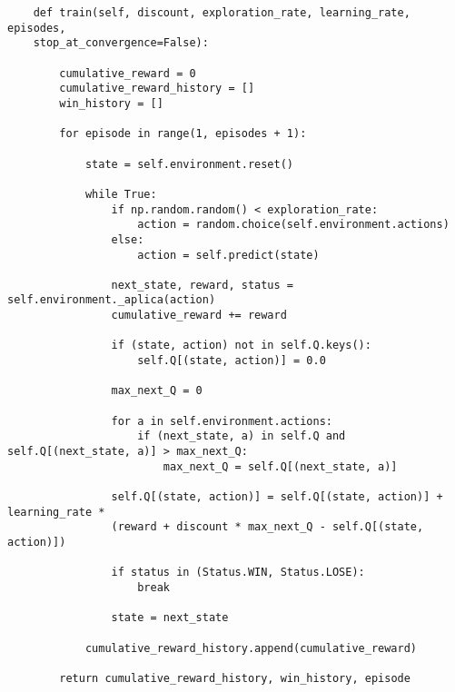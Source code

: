 \documentclass{article}
\begin{document}
\begin{verbatim}
    def train(self, discount, exploration_rate, learning_rate, episodes, 
    stop_at_convergence=False):
        
        cumulative_reward = 0
        cumulative_reward_history = []
        win_history = []

        for episode in range(1, episodes + 1):
        
            state = self.environment.reset()
            
            while True:
                if np.random.random() < exploration_rate:
                    action = random.choice(self.environment.actions)
                else:
                    action = self.predict(state)
                    
                next_state, reward, status = self.environment._aplica(action)
                cumulative_reward += reward
                
                if (state, action) not in self.Q.keys():
                    self.Q[(state, action)] = 0.0
                
                max_next_Q = 0
                
                for a in self.environment.actions:
                    if (next_state, a) in self.Q and self.Q[(next_state, a)] > max_next_Q:
                        max_next_Q = self.Q[(next_state, a)]
                        
                self.Q[(state, action)] = self.Q[(state, action)] + learning_rate *
                (reward + discount * max_next_Q - self.Q[(state, action)])
                
                if status in (Status.WIN, Status.LOSE): 
                    break
                    
                state = next_state
                
            cumulative_reward_history.append(cumulative_reward)
            
        return cumulative_reward_history, win_history, episode
\end{verbatim}
\newpage
\end{document}
